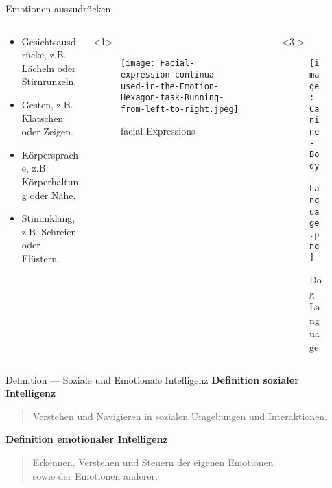 \documentclass[aspectratio=169]{beamer}
\begin{document}
\begin{frame}{Emotionen auszudrücken}
  \begin{columns}
    \begin{column}{0.7\textwidth}
      \begin{itemize}
        \item<1-> Gesichtsausdrücke, z.B. Lächeln oder Stirnrunzeln.
        \item<2-> Gesten, z.B. Klatschen oder Zeigen.
        \item<3-> Körpersprache, z.B. Körperhaltung oder Nähe.
        \item<4-> Stimmklang, z.B. Schreien oder Flüstern.
      \end{itemize}
    \end{column}
    \begin{column}{0.3\textwidth}<1>
      \begin{figure}[h]
        \centering
        \texttt{[image: Facial-expression-continua-used-in-the-Emotion-Hexagon-task-Running-from-left-to-right.jpeg]}
        \caption{facial Expressions~\cite{facialExpressionRecognition} }
      \end{figure}
    \end{column}
    \begin{column}{0.3\textwidth}<3->
      \begin{figure}[h]
        \centering
        \texttt{[image: Canine-Body-Language.png]}
        \caption{Dog Language~\cite{doggieLanguage} }
      \end{figure}
    \end{column}
  \end{columns}
\end{frame}

\begin{frame}{Definition --- Soziale und Emotionale Intelligenz}
  \textbf{Definition sozialer Intelligenz}
  \begin{quote}
    Verstehen und Navigieren in sozialen Umgebungen und Interaktionen.
  \end{quote}
  \vspace{1cm}

  \textbf{Definition emotionaler Intelligenz}
  \begin{quote}
    Erkennen, Verstehen und Steuern der eigenen Emotionen\\
    sowie der Emotionen anderer.
  \end{quote}
\end{frame}
\end{document}
